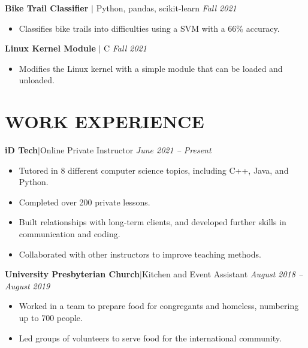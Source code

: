 \documentclass[11pt, a4paper, roman]{moderncv}
\newcommand{\project}[5]{
	\textbf{#1}
	$|$ #3 
	\hfill\textit{#4}
	#5
	\vspace{2mm}
}
\newcommand{\entry}[4]{
	\textbf{#1}\:$|$\:#2 
	\hfill\textit{#3}
	#4
	\vspace{2mm}
}
\begin{document}
{\project{Bike Trail Classifier}{https://github.com/GoneSahlin/BikeTrailSVM}{Python, pandas, scikit-learn}{Fall 2021}
	{\begin{itemize}
    		\item Classifies bike trails into difficulties using a SVM with a 66\% accuracy.
	\end{itemize}}
}
{\project{Linux Kernel Module}{https://github.com/GU-2021-Fall-CPSC346/hw5-linux-kernel-module-dev-GoneSahlin}{C}{Fall 2021}
	{\begin{itemize}
   		\item Modifies the Linux kernel with a simple module that can be loaded and unloaded.
	\end{itemize}}
}

\vspace*{-2mm}
\section{WORK EXPERIENCE}

\entry{iD Tech}{Online Private Instructor}{June 2021 -- Present}
{\begin{itemize}
    \item Tutored in 8 different computer science topics, including C++, Java, and Python.
    \item Completed over 200 private lessons.
    \item Built relationships with long-term clients, and developed further skills in communication and coding.
    \item Collaborated with other instructors to improve teaching methods.
  \end{itemize}
}
{\entry{University Presbyterian Church}{Kitchen and Event Assistant}{August 2018 -- August 2019}
	{\begin{itemize}
   		\item Worked in a team to prepare food for congregants and homeless, numbering up to 700 people.
    		\item Led groups of volunteers to serve food for the international community.
  	\end{itemize}}
}

\end{document}

